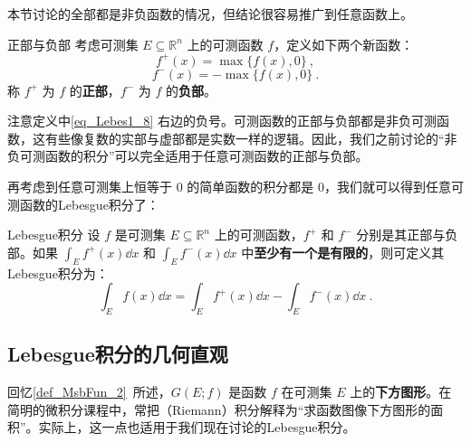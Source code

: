 本节讨论的全部都是非负函数的情况，但结论很容易推广到任意函数上。

\begin{definition}{正部与负部}
考虑可测集 $E\subseteq\mathbb{R}^n$ 上的可测函数 $f$，定义如下两个新函数：
\begin{equation}
f^+(x) = \max\{f(x), 0\}~,
\end{equation}
\begin{equation}\label{eq_Lebes1_8}
f^-(x) = -\max\{f(x), 0\}~.
\end{equation}
称 $f^+$ 为 $f$ 的\textbf{正部}，$f^-$ 为 $f$ 的\textbf{负部}。

\end{definition}

注意定义中\autoref{eq_Lebes1_8} 右边的负号。可测函数的正部与负部都是非负可测函数，这有些像复数的实部与虚部都是实数一样的逻辑。因此，我们之前讨论的“非负可测函数的积分”可以完全适用于任意可测函数的正部与负部。

再考虑到任意可测集上恒等于 $0$ 的简单函数的积分都是 $0$，我们就可以得到任意可测函数的Lebesgue积分了：

\begin{definition}{Lebesgue积分}\label{def_Lebes1_1}
设 $f$ 是可测集 $E\subseteq\mathbb{R}^n$ 上的可测函数，$f^+$ 和 $f^-$ 分别是其正部与负部。如果 $\int_E f^+(x) \dd x$ 和 $\int_E f^-(x) \dd x$ 中\textbf{至少有一个是有限的}，则可定义其Lebesgue积分为：
\begin{equation}
\int_E f(x) \dd x = \int_E f^+(x) \dd x - \int_E f^-(x) \dd x~.
\end{equation}
\end{definition}














\subsection{Lebesgue积分的几何直观}


回忆\autoref{def_MsbFun_2}~所述，$G(E; f)$ 是函数 $f$ 在可测集 $E$ 上的\textbf{下方图形}。在简明的微积分课程中，常把（Riemann）积分解释为“求函数图像下方图形的面积”。实际上，这一点也适用于我们现在讨论的Lebesgue积分。

